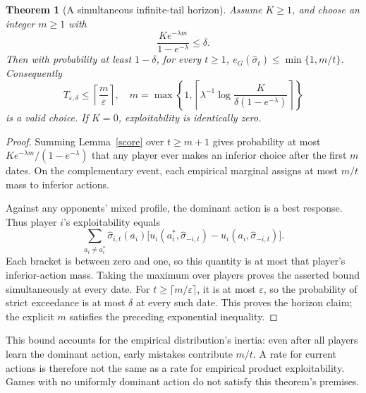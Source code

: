 \documentclass[11pt]{article}
\newtheorem{theorem}{Theorem}
\theoremstyle{remark}
\begin{document}
\begin{theorem}[A simultaneous infinite-tail horizon]\label{model}
Assume $K\geq1$, and choose an integer $m\geq1$ with
\[
 \frac{K e^{-\lambda m}}{1-e^{-\lambda}}\leq\delta.
\]
Then with probability at least $1-\delta$, for every $t\geq1$,
$e_G(\widehat\sigma_t)\leq\min\{1,m/t\}$.
Consequently
\[
 T_{\varepsilon,\delta}\leq\left\lceil\frac m\varepsilon\right\rceil,
\quad
 m=\max\left\{1,\left\lceil\lambda^{-1}
 \log\frac{K}{\delta(1-e^{-\lambda})}\right\rceil\right\}
\]
is a valid choice. If $K=0$, exploitability is identically zero.
\end{theorem}
\begin{proof}
Summing Lemma~\ref{score} over $t\geq m+1$ gives probability at most $K e^{-\lambda m}/(1-e^{-\lambda})$ that any player ever makes an inferior choice after the first $m$ dates. On the complementary event, each empirical marginal assigns at most $m/t$ mass to inferior actions.

Against any opponents' mixed profile, the dominant action is a best response. Thus player $i$'s exploitability equals
\[
 \sum_{a_i\ne a_i^*}\widehat\sigma_{i,t}(a_i)
 \bigl[u_i(a_i^*,\widehat\sigma_{-i,t})-
 u_i(a_i,\widehat\sigma_{-i,t})\bigr].
\]
Each bracket is between zero and one, so this quantity is at most that player's inferior-action mass. Taking the maximum over players proves the asserted bound simultaneously at every date. For $t\geq\lceil m/\varepsilon\rceil$, it is at most $\varepsilon$, so the probability of strict exceedance is at most $\delta$ at every such date. This proves the horizon claim; the explicit $m$ satisfies the preceding exponential inequality.
\end{proof}

This bound accounts for the empirical distribution's inertia: even after all players learn the dominant action, early mistakes contribute $m/t$. A rate for current actions is therefore not the same as a rate for empirical product exploitability. Games with no uniformly dominant action do not satisfy this theorem's premises.
\end{document}
